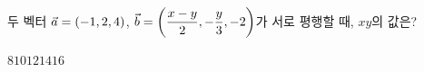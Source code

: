두 벡터 $\vec{a}=(-1{,}\mkern3mu\mathopen{}2{,}\mkern3mu\mathopen{}4)$, $\vec{b}=\left(\dfrac{x-y}{2}{,}\mkern3mu\mathopen{}-\dfrac{y}{3}{,}\mkern3mu\mathopen{}-2\right)$가 서로 평행할 때, $xy$의 값은?
\begin{choices32}{$8$}{$10$}{$12$}{$14$}{$16$}\end{choices32}
